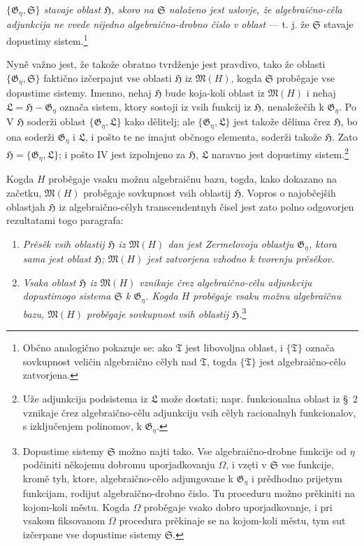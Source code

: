 \documentclass[11pt]{article}
\begin{document}
{\itshape $\{\mathfrak G_\eta,\mathfrak S\}$ stavaje oblast $\mathfrak H$,
skoro na $\mathfrak S$ naloženo jest uslovje, že algebraično-cěla adjunkcija ne
vvede nijedno algebraično-drobno čislo v oblast} --- t. j. že $\mathfrak S$
stavaje dopustimy sistem.\footnote{Občno analogično pokazuje se: ako
$\mathfrak T$ jest libovoljna oblast, i $\{\mathfrak T\}$ označa sovkupnost
veličin algebraično cělyh nad $\mathfrak T$, togda $\{\mathfrak T\}$ jest
algebraično-cělo zatvorjena.}

Nyně važno jest, že takože obratno tvrdženje jest pravdivo, tako že oblasti
$\{\mathfrak G_\eta,\mathfrak S\}$ faktično izčerpajut vse oblasti
$\mathfrak H$ iz $\mathfrak M(H)$, kogda $\mathfrak S$ proběgaje vse dopustime
sistemy. Imenno, nehaj $\mathfrak H$ bude koja-koli oblast iz $\mathfrak M(H)$
i nehaj $\mathfrak L=\mathfrak H-\mathfrak G_\eta$ označa sistem, ktory sostoji
iz vsih funkcij iz $\mathfrak H$, nenaležečih k $\mathfrak G_\eta$. Po V
$\mathfrak H$ soderži oblast $\{\mathfrak G_\eta,\mathfrak L\}$ kako dělitelj;
ale $\{\mathfrak G_\eta,\mathfrak L\}$ jest takože dělima črez $\mathfrak H$,
bo ona soderži $\mathfrak G_\eta$ i $\mathfrak L$, i pošto te ne imajut
občnogo elementa, soderži takože $\mathfrak H$. Zato
$\mathfrak H=\{\mathfrak G_\eta,\mathfrak L\}$; i pošto IV jest izpolnjeno za
$\mathfrak H$, $\mathfrak L$ naravno jest dopustimy sistem.\footnote{Uže
adjunkcija podsistema iz $\mathfrak L$ može dostati; napr. funkcionalna oblast
iz \S\ 2 vznikaje črez algebraično-cělu adjunkciju vsih cělyh racionalnyh
funkcionalov, s izključenjem polinomov, k $\mathfrak G_\eta$.}

Kogda $H$ proběgaje vsaku možnu algebraičnu bazu, togda, kako dokazano na
začetku, $\mathfrak M(H)$ proběgaje sovkupnost vsih oblastij $\mathfrak H$.
Vopros o najobčejših oblastjah $\mathfrak H$ iz algebraično-cělyh
transcendentnyh čisel jest zato polno odgovorjen rezultatami togo paragrafa:
\begin{enumerate}
\item[a)] {\itshape Prěsěk vsih oblastij $\mathfrak H$ iz $\mathfrak M(H)$ dan
jest Zermelovoju oblastju $\mathfrak G_\eta$, ktora sama jest oblast
$\mathfrak H$; $\mathfrak M(H)$ jest zatvorjena vzhodno k tvorenju prěsěkov.}
\item[b)] {\itshape Vsaka oblast $\mathfrak H$ iz $\mathfrak M(H)$ vznikaje
črez algebraično-cělu adjunkciju dopustimogo sistema $\mathfrak S$ k
$\mathfrak G_\eta$. Kogda $H$ proběgaje vsaku možnu algebraičnu bazu,
$\mathfrak M(H)$ proběgaje sovkupnost vsih oblastij $\mathfrak H$.}\footnote{Dopustime
sistemy $\mathfrak S$ možno najti tako. Vse algebraično-drobne funkcije od
$\eta$ podčiniti někojemu dobromu uporjadkovanju $\Omega$, i vzęti v
$\mathfrak S$ vse funkcije, kromě tyh, ktore, algebraično-cělo adjungovane k
$\mathfrak G_\eta$ i prědhodno prijetym funkcijam, rodijut algebraično-drobno
čislo. Tu proceduru možno prěkiniti na kojom-koli městu. Kogda $\Omega$
proběgaje vsako dobro uporjadkovanje, i pri vsakom fiksovanom $\Omega$ procedura
prěkinaje se na kojom-koli městu, tym sut izčerpane vse dopustime sistemy
$\mathfrak S$.}
\end{enumerate}
\end{document}
